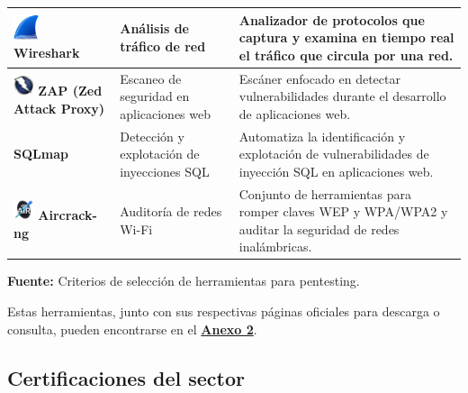 \documentclass[a4paper, 11pt]{article}
\begin{document}
\begin{table}[H]
\begin{tabular}{|m{5cm}|m{3.5cm}|m{8cm}|}
    \hline
    \includegraphics[width=0.75cm]{images/wireshark.png} \textbf{Wireshark} & Análisis de tráfico de red & Analizador de protocolos que captura y examina en tiempo real el tráfico que circula por una red. \\
    \hline
    \includegraphics[width=0.6cm]{images/zap.jpeg} \textbf{ZAP (Zed Attack Proxy)} & Escaneo de seguridad en aplicaciones web & Escáner enfocado en detectar vulnerabilidades durante el desarrollo de aplicaciones web. \\
    \hline
    \textbf{SQLmap} & Detección y explotación de inyecciones SQL & Automatiza la identificación y explotación de vulnerabilidades de inyección SQL en aplicaciones web. \\
    \hline
    \includegraphics[width=0.6cm]{images/aircrack.jpeg} \textbf{Aircrack-ng} & Auditoría de redes Wi-Fi & Conjunto de herramientas para romper claves WEP y WPA/WPA2 y auditar la seguridad de redes inalámbricas. \\
    \hline
\end{tabular}
\begin{flushleft}\centering
    \footnotesize \textbf{Fuente:} Criterios de selección de herramientas para pentesting. \cite{felipe2024}
\end{flushleft}
\end{table}
\par\vspace{0.5cm}
Estas herramientas, junto con sus respectivas páginas oficiales para descarga o consulta, pueden encontrarse en el \hyperref[anexo:2]{\textbf{Anexo 2}}.

\par\vspace{0.5cm}


\subsection{Certificaciones del sector}
\par\vspace{0.5cm}
\end{document}
